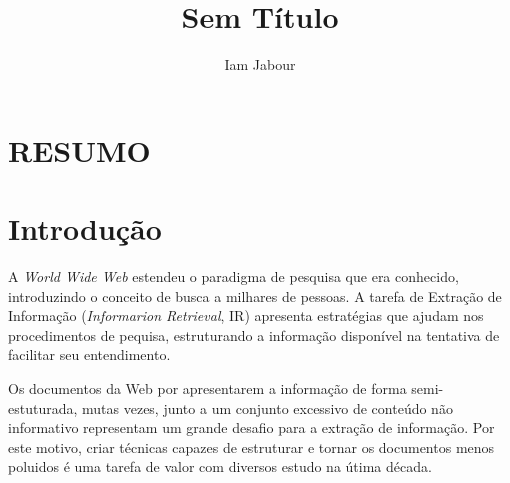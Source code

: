 \documentclass{acm_proc_article-sp}
\newcommand{\remove}[1]{}
\numberwithin{equation}{section}
\begin{document}
\title{Sem Título}

\author{
\alignauthor
Iam Jabour  
\and \alignauthor {}
}


\maketitle

\begin{abstract}


\end{abstract}

\section*{RESUMO}\normalsize %







\section{Introdução}

A {\it World Wide Web} estendeu o paradigma de pesquisa que era conhecido, 
	introduzindo o conceito de busca a milhares de pessoas.
A tarefa de Extração de Informação ({\it Informarion Retrieval}, IR) apresenta 
	estratégias que ajudam nos procedimentos de pequisa, estruturando a 
	informação disponível na tentativa de facilitar seu entendimento.

Os documentos da Web por apresentarem a informação de forma semi-estuturada,
	mutas vezes, junto a um conjunto excessivo de conteúdo não informativo
	representam um grande desafio para a extração de informação. 
Por este motivo,
	criar técnicas capazes de estruturar e tornar os documentos menos poluidos
	é uma tarefa de valor com diversos estudo na útima década.

\remove{
Retirar uma parcela de informação não relevante desses documentos 
	proporciona benefícios claros.
}
\end{document}

